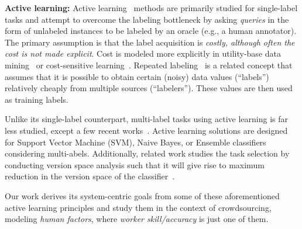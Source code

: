 {\bf Active learning:} Active learning~\cite{al-clus1, al1, al2, al4, qbc1, qbc2, qbc3,error-reduction,model-change, variance-reduction,al-survey,densityweightedmethod,bellare2012active} methods are primarily studied for single-label tasks and attempt to overcome the labeling bottleneck by asking {\em queries} in the form of unlabeled instances to be labeled by an oracle (e.g., a human annotator). The primary assumption is that the label acquisition is {\em costly, although often the
cost is not made explicit}. Cost is modeled more explicitly in utility-base data mining~\cite{provost2005toward} or cost-sensitive learning~\cite{turney2000types}. Repeated labeling~\cite{repeated-labeling} is a related concept that assumes that it is possible to obtain certain (noisy) data values (“labels”) relatively cheaply from multiple sources (“labelers”). These values are then used as training labels. 

Unlike its single-label counterpart, multi-label tasks using active learning is far less studied, except a few recent works~\cite{multi0,multi1,multi2,multi3}. Active learning solutions are designed for Support Vector Machine (SVM), Naive Bayes, or Ensemble classifiers~\cite{multi0,multi1,multi2,multi3} considering multi-abels. Additionally, related work studies the task selection by conducting version space analysis such that it will give rise to maximum reduction in the version space of the classifier~\cite{versionspace}. 

Our work derives its system-centric goals from some of these aforementioned active learning principles and study them in the context of crowdsourcing, modeling {\em human factors}, where {\em worker skill/accuracy} is just one of them.


